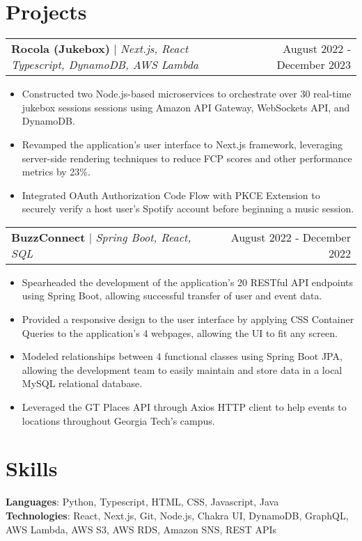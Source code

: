 \documentclass[letterpaper,11pt]{article}
\makeatletter
\newcommand{\resumeProjectHeading}[3]{
    \begin{tabular*}{0.97\textwidth}[t]{l@{\extracolsep{\fill}}r}
      \textbf{#1} $\vert$ \textit{#2}  & {#3}
    \end{tabular*}\vspace{-3pt}
}
\newcommand{\resumeItemListStart}{\begin{itemize}[noitemsep]\vspace{-4pt}}
\newcommand{\resumeItemListEnd}{\end{itemize}}
\makeatother
\begin{document}
\section{Projects}
    \resumeProjectHeading{Rocola (Jukebox)}{Next.js, React Typescript, DynamoDB, AWS Lambda }{August 2022 - December 2023}
      \resumeItemListStart
        \item {Constructed two Node.js-based microservices to orchestrate over 30 real-time jukebox sessions sessions using Amazon API Gateway, WebSockets API, and DynamoDB.}
        \item {Revamped the application's user interface to Next.js framework, leveraging server-side rendering techniques to reduce FCP scores and other performance metrics by 23\%.}
        \item {Integrated OAuth Authorization Code Flow with PKCE Extension to securely verify a host user's Spotify account before beginning a music session.}
      \resumeItemListEnd

    \resumeProjectHeading{BuzzConnect}{Spring Boot, React, SQL}{August 2022 - December 2022}
      \resumeItemListStart
        \item {Spearheaded the development of the application's 20 RESTful API endpoints using Spring Boot, allowing successful transfer of user and event data.}
        \item {Provided a responsive design to the user interface by applying CSS Container Queries to the application's 4 webpages, allowing the UI to fit any screen.}
        \item {Modeled relationships between 4 functional classes using Spring Boot JPA, allowing the development team to easily maintain and store data in a local MySQL relational database.}
        \item {Leveraged the GT Places API through Axios HTTP client to help events to locations throughout Georgia Tech's campus.}
      \resumeItemListEnd

\section{Skills}
    \textbf{Languages}{: Python, Typescript, HTML, CSS, Javascript, Java } \\
    \textbf{Technologies}{: React, Next.js, Git, Node.js, Chakra UI, DynamoDB, GraphQL, AWS Lambda, AWS S3, AWS RDS, Amazon SNS, REST APIs}
\end{document}
